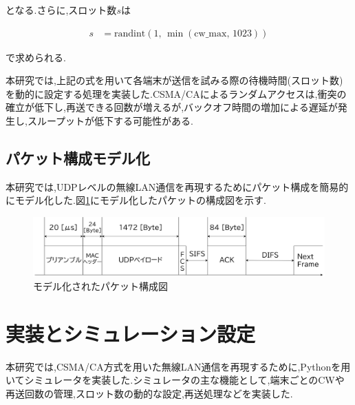 \documentclass[a4paper, 10pt]{ltjsarticle}
\begin{document}
となる.さらに,スロット数$s$は

\begin{align}
  s &= \mathrm{randint}(1, \, \min(\text{cw\_max}, \, 1023))
  \label{slot}
\end{align}

で求められる.

本研究では,上記の式を用いて各端末が送信を試みる際の待機時間(スロット数)を動的に設定する処理を実装した.CSMA/CAによるランダムアクセスは,衝突の確立が低下し,再送できる回数が増えるが,バックオフ時間の増加による遅延が発生し,スループットが低下する可能性がある.

\subsection{パケット構成モデル化}

本研究では,UDPレベルの無線LAN通信を再現するためにパケット構成を簡易的にモデル化した.図\ref{packet}にモデル化したパケットの構成図を示す.



\begin{figure}[H]
  \centering
  \includegraphics[width=1\columnwidth]{./assets/packet.png}
  \caption{モデル化されたパケット構成図}
  \label{packet}
\end{figure}





\section{実装とシミュレーション設定}

本研究では,CSMA/CA方式を用いた無線LAN通信を再現するために,Pythonを用いてシミュレータを実装した.シミュレータの主な機能として,端末ごとのCWや再送回数の管理,スロット数の動的な設定,再送処理などを実装した.
\end{document}
